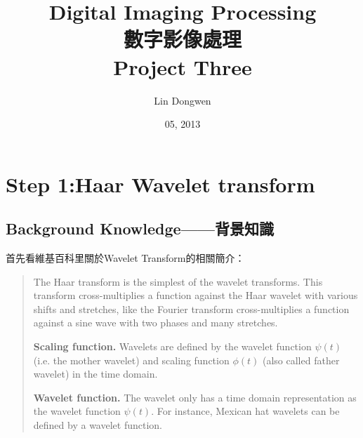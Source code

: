 \documentclass[a4paper,12pt]{article}%
\title{Digital Imaging Processing\\ 數字影像處理 \\ Project Three  }
\author{\small Lin Dongwen}
\date{05, 2013}
\begin{document}
    \maketitle
    \newpage
%

\section{Step 1:Haar Wavelet transform}
\subsection{Background Knowledge——背景知識}

\noindent 首先看維基百科里關於Wavelet Transform的相關簡介：
\begin{quote}

The Haar transform is the simplest of the wavelet transforms. This transform cross-multiplies a function against the Haar wavelet with various shifts and stretches, like the Fourier transform cross-multiplies a function against a sine wave with two phases and many stretches.

\textbf{Scaling function.} Wavelets are defined by the wavelet function $\psi(t)$ (i.e. the mother wavelet) and scaling function $\phi(t)$ (also called father wavelet) in the time domain.

\textbf{Wavelet function.} The wavelet only has a time domain representation as the wavelet function $\psi(t)$.
For instance, Mexican hat wavelets can be defined by a wavelet function.
\end{quote}
\end{document}
